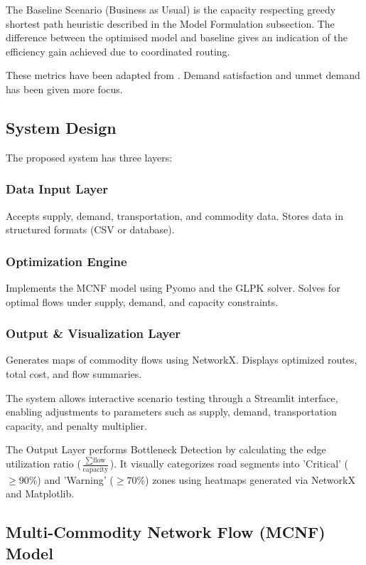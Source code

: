 \documentclass{icsthesis}
\begin{document}
\begin{mainmatter}
\begin{itemize}
\end{itemize}


The Baseline Scenario (Business as Usual) is the capacity respecting greedy shortest path heuristic described in the Model Formulation subsection. The difference between the optimised model and baseline gives an indication of the efficiency gain achieved due to coordinated routing.

These metrics have been adapted from \citet{rodrigo2018}. Demand satisfaction and unmet demand has been given more focus.



\subsection{System Design}
The proposed system has three layers:

\subsubsection{Data Input Layer}
Accepts supply, demand, transportation, and commodity data.
Stores data in structured formats (CSV or database).

\subsubsection{Optimization Engine}
Implements the MCNF model using Pyomo and the GLPK solver.
Solves for optimal flows under supply, demand, and capacity constraints.

\subsubsection{Output \& Visualization Layer}
Generates maps of commodity flows using NetworkX.
Displays optimized routes, total cost, and flow summaries.


The system allows interactive scenario testing through a Streamlit interface, enabling adjustments to parameters such as supply, demand, transportation capacity, and penalty multiplier.

The Output Layer performs Bottleneck Detection by calculating the edge utilization ratio ($\frac{\sum \text{flow}}{\text{capacity}}$). It visually categorizes road segments into 'Critical' ($\ge 90\%$) and 'Warning' ($\ge 70\%$) zones using heatmaps generated via NetworkX and Matplotlib.

\subsection{Multi-Commodity Network Flow (MCNF) Model}


\end{mainmatter}
\end{document}

